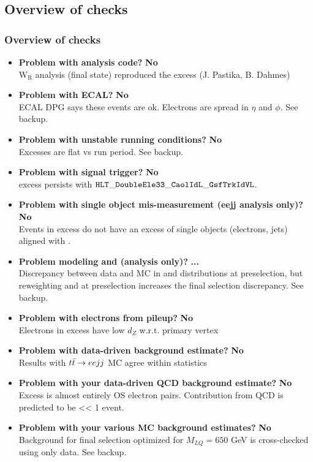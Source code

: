 \documentclass[bigger]{beamer}
\providecommand{\alert}[1]{\textbf{#1}}
\begin{document}
\subsection{Overview of checks}
\label{sec-5-5}
\begin{frame}
\frametitle{Overview of checks}
\label{sec-5-5-1}

\tiny
\begin{itemize}
\item \textbf{Problem with analysis code?} \alert{No} \\ 
$\text{W}_{\text{R}}$ analysis (\eejj final state) reproduced the excess (J. Pastika, B. Dahmes)
\item \textbf{Problem with ECAL?} \alert{No} \\
ECAL DPG says these events are ok.  Electrons are spread in $\eta$ and $\phi$.  See backup.
\item \textbf{Problem with unstable running conditions?} \alert{No} \\ 
Excesses are flat vs run period. See backup.
\item \textbf{Problem with signal trigger?} \alert{No} \\ 
\eejj excess persists with ${\tt HLT\_DoubleEle33\_CaolIdL\_GsfTrkIdVL}$.
\item \textbf{Problem with single object mis-measurement (eejj analysis only)?} \alert{No} \\ 
Events in \eejj excess do not have an excess of single objects (electrons, jets) aligned with \met.
\item \textbf{Problem modeling \met and \mt (\enujj analysis only)?} \alert{...} \\
Discrepancy between data and MC in \met and \mt distributions at \enujj preselection, but reweighting
\mt and \met at preselection increases the final selection discrepancy.  See backup.
\item \textbf{Problem with electrons from pileup?} \alert{No} \\ 
Electrons in excess have low $d_{Z}$ w.r.t. primary vertex
\item \textbf{Problem with data-driven \ttbar background estimate?} \alert{No} \\
Results with $t\bar{t} \rightarrow eejj$ MC agree within statistics
\item \textbf{Problem with your data-driven QCD background estimate?} \alert{No} \\
Excess is almost entirely OS electron pairs.  Contribution from QCD is predicted to be << 1 event.
\item \textbf{Problem with your various MC background estimates?} \alert{No} \\
Background for final selection optimized for $M_{LQ} = 650$ GeV is cross-checked using only data.  See backup.
\end{itemize}
\end{frame}
\end{document}

